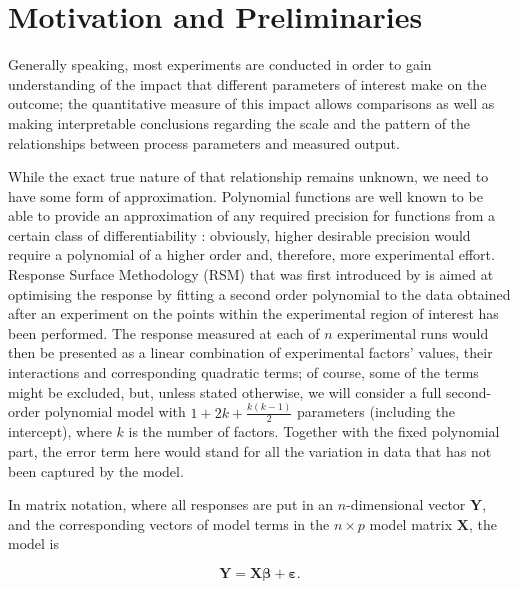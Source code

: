 \section{Motivation and Preliminaries}

Generally speaking, most experiments are conducted in order to gain understanding of the impact that different parameters of interest make on the outcome; the quantitative measure of this impact allows comparisons as well as making interpretable conclusions regarding the scale and the pattern of the relationships between process parameters and measured output. 

While the exact true nature of that relationship remains unknown, we need to have some form of approximation. Polynomial functions are well known to be able to provide an approximation of any required precision for functions from a certain class of differentiability \citep{Rudin1987real}: obviously, higher desirable precision would require a polynomial of a higher order and, therefore, more experimental effort. Response Surface Methodology (RSM) that was first introduced by \cite{Box1951Roy} is aimed at optimising the response by fitting a second order polynomial to the data obtained after an experiment on the points within the experimental region of interest has been performed. The response measured at each of $n$ experimental runs would then be presented as a linear combination of experimental factors' values, their interactions and corresponding quadratic terms; of course, some of the terms might be excluded, but, unless stated otherwise, we will consider a full second-order polynomial model with $1+2k+\frac{k(k-1)}{2}$ parameters (including the intercept), where $k$ is the number of factors. Together with the fixed polynomial part, the error term here would stand for all the variation in data that has not been captured by the model. 

In matrix notation, where all responses are put in an $n$-dimensional vector $\bm{Y}$, and the corresponding vectors of model terms in the $n\times p$ model matrix $\bm{X}$, the model is

\begin{equation}
\label{eq::intro_model}
\bm{Y}=\bm{X}\bm{\beta}+\bm{\varepsilon}.
\end{equation} 	

